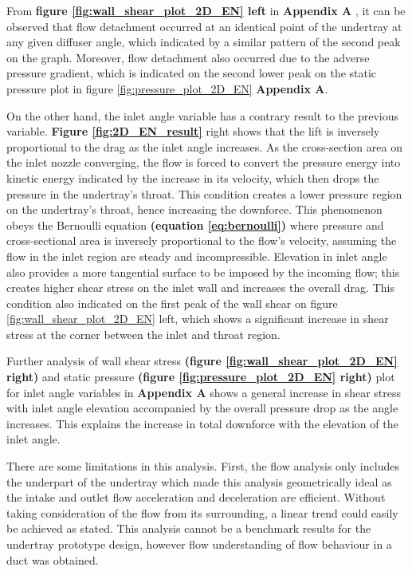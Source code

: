 \noindent From \textbf{figure \ref{fig:wall_shear_plot_2D_EN} left} in \textbf{Appendix A} ,  it can be observed that flow detachment occurred at an identical point of the undertray at any given diffuser angle, which indicated by a similar pattern of the second peak on the graph. Moreover,  flow detachment also occurred due to the adverse pressure gradient, which is indicated on the second lower peak on the static pressure plot in figure \ref{fig:pressure_plot_2D_EN} \textbf{Appendix A}.

\noindent On the other hand, the inlet angle variable has a contrary result to the previous variable. \textbf{Figure \ref{fig:2D_EN_result}} right shows that the lift is inversely proportional to the drag as the inlet angle increases.  As the cross-section area on the inlet nozzle converging, the flow is forced to convert the pressure energy into kinetic energy indicated by the increase in its velocity, which then drops the pressure in the undertray's throat. This condition creates a lower pressure region on the undertray's throat, hence increasing the downforce. This phenomenon obeys the Bernoulli equation \textbf{ (equation \ref{eq:bernoulli})} where pressure and cross-sectional area is inversely proportional to the flow's velocity, assuming the flow in the inlet region are steady and incompressible.  Elevation in inlet angle also provides a more tangential surface to be imposed by the incoming flow; this creates higher shear stress on the inlet wall and increases the overall drag. This condition also indicated on the first peak of the wall shear on figure \ref{fig:wall_shear_plot_2D_EN} left, which shows a significant increase in shear stress at the corner between the inlet and throat region.

\noindent Further analysis of wall shear stress \textbf{(figure \ref{fig:wall_shear_plot_2D_EN} right)} and static pressure \textbf{(figure \ref{fig:pressure_plot_2D_EN} right)} plot for inlet angle variables in \textbf{Appendix A} shows a general increase in shear stress with inlet angle elevation accompanied by the overall pressure drop as the angle increases. This explains the increase in total downforce with the elevation of the inlet angle.

\noindent There are some limitations in this analysis. First, the flow analysis only includes the underpart of the undertray which made this analysis geometrically ideal as the intake and outlet flow acceleration and deceleration are efficient. Without taking consideration of the flow from its surrounding, a linear trend could easily be achieved as stated. This analysis cannot be a benchmark results for the undertray prototype design, however flow understanding of flow behaviour in a duct was obtained.

